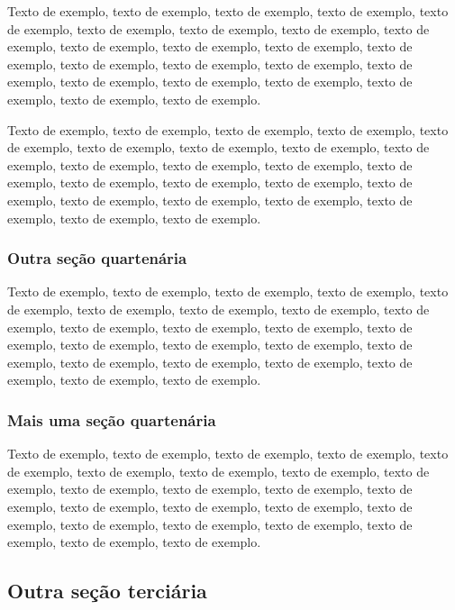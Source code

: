\documentclass[
	12pt,				%
	oneside,			%
	a4paper,			%
	english,			%
	brazil				%
	]{abntex2ppgsi}
\begin{document}

Texto de exemplo, texto de exemplo, texto de exemplo, texto de exemplo, texto de exemplo, texto de exemplo, texto de exemplo, texto de exemplo, texto de exemplo, texto de exemplo, texto de exemplo, texto de exemplo, texto de exemplo, texto de exemplo, texto de exemplo, texto de exemplo, texto de exemplo, texto de exemplo, texto de exemplo, texto de exemplo, texto de exemplo, texto de exemplo, texto de exemplo.


Texto de exemplo, texto de exemplo, texto de exemplo, texto de exemplo, texto de exemplo, texto de exemplo, texto de exemplo, texto de exemplo, texto de exemplo, texto de exemplo, texto de exemplo, texto de exemplo, texto de exemplo, texto de exemplo, texto de exemplo, texto de exemplo, texto de exemplo, texto de exemplo, texto de exemplo, texto de exemplo, texto de exemplo, texto de exemplo, texto de exemplo.

\subsubsection{Outra seção quartenária}

Texto de exemplo, texto de exemplo, texto de exemplo, texto de exemplo, texto de exemplo, texto de exemplo, texto de exemplo, texto de exemplo, texto de exemplo, texto de exemplo, texto de exemplo, texto de exemplo, texto de exemplo, texto de exemplo, texto de exemplo, texto de exemplo, texto de exemplo, texto de exemplo, texto de exemplo, texto de exemplo, texto de exemplo, texto de exemplo, texto de exemplo.

\subsubsection{Mais uma seção quartenária}

Texto de exemplo, texto de exemplo, texto de exemplo, texto de exemplo, texto de exemplo, texto de exemplo, texto de exemplo, texto de exemplo, texto de exemplo, texto de exemplo, texto de exemplo, texto de exemplo, texto de exemplo, texto de exemplo, texto de exemplo, texto de exemplo, texto de exemplo, texto de exemplo, texto de exemplo, texto de exemplo, texto de exemplo, texto de exemplo, texto de exemplo.

\subsection{Outra seção terciária}
\end{document}
